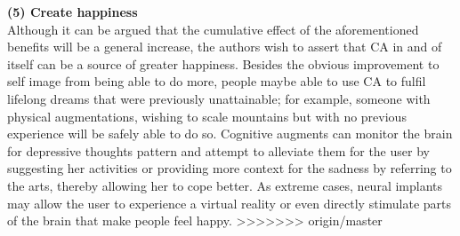 {\bf (5) Create happiness} \\
Although it can be argued that the cumulative effect of the aforementioned benefits will be a general increase, the authors wish to assert that CA in and of itself can be a source of greater happiness. Besides the obvious improvement to self image from being able to do more, people maybe able to use CA to fulfil lifelong dreams that were previously unattainable; for example, someone with physical augmentations, wishing to scale mountains but with no previous experience will be safely able to do so. Cognitive augments can monitor the brain for depressive thoughts pattern and attempt to alleviate them for the user by suggesting her activities or providing more context for the sadness by referring to the arts, thereby allowing her to cope better. As extreme cases, neural implants may allow the user to experience a virtual reality or even directly stimulate parts of the brain that make people feel happy.
>>>>>>> origin/master



